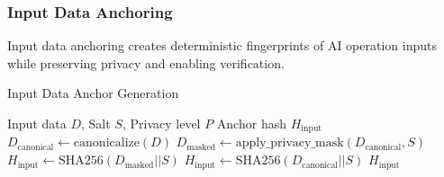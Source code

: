 \documentclass[12pt,a4paper]{article}
\begin{document}
\subsubsection{Input Data Anchoring}

Input data anchoring creates deterministic fingerprints of AI operation inputs while preserving privacy and enabling verification.

\begin{algorithm}[H]
\caption{Input Data Anchor Generation}
\begin{algorithmic}[1]
\REQUIRE Input data $D$, Salt $S$, Privacy level $P$
\ENSURE Anchor hash $H_{\text{input}}$
\STATE $D_{\text{canonical}} \leftarrow \text{canonicalize}(D)$
    \STATE $D_{\text{masked}} \leftarrow \text{apply\_privacy\_mask}(D_{\text{canonical}}, S)$
    \STATE $H_{\text{input}} \leftarrow \text{SHA256}(D_{\text{masked}} || S)$
\ELSE
    \STATE $H_{\text{input}} \leftarrow \text{SHA256}(D_{\text{canonical}} || S)$
\ENDIF
\RETURN $H_{\text{input}}$
\end{algorithmic}
\end{algorithm}
\end{document}
